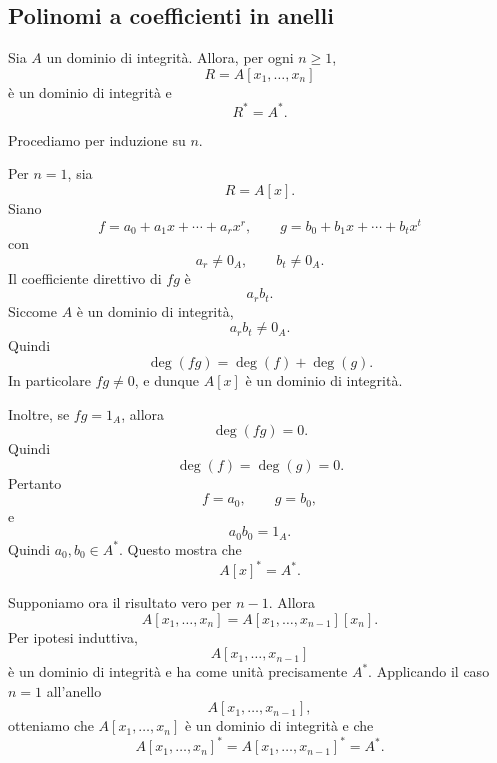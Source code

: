 \documentclass[a4paper]{article}
\begin{document}
\subsection{Polinomi a coefficienti in anelli}

\begin{radioactive}
\begin{snippetproposition}{}
    Sia \(A\) un dominio di integrità. Allora, per ogni \(n\geq 1\),
    \[
        R=A[x_1,\ldots,x_n]
    \]
    è un dominio di integrità e
    \[
        R^\ast=A^\ast.
    \]
\end{snippetproposition}
\end{radioactive}

\begin{radioactive}
\begin{snippetproof}{}
    Procediamo per induzione su \(n\).

    Per \(n=1\), sia
    \[
        R=A[x].
    \]
    Siano
    \[
        f=a_0+a_1x+\cdots+a_rx^r,
        \qquad
        g=b_0+b_1x+\cdots+b_tx^t
    \]
    con
    \[
        a_r\neq 0_A,
        \qquad
        b_t\neq 0_A.
    \]
    Il coefficiente direttivo di \(fg\) è
    \[
        a_rb_t.
    \]
    Siccome \(A\) è un dominio di integrità,
    \[
        a_rb_t\neq 0_A.
    \]
    Quindi
    \[
        \deg(fg)=\deg(f)+\deg(g).
    \]
    In particolare \(fg\neq 0\), e dunque \(A[x]\) è un dominio di integrità.

    Inoltre, se \(fg=1_A\), allora
    \[
        \deg(fg)=0.
    \]
    Quindi
    \[
        \deg(f)=\deg(g)=0.
    \]
    Pertanto
    \[
        f=a_0,
        \qquad
        g=b_0,
    \]
    e
    \[
        a_0b_0=1_A.
    \]
    Quindi \(a_0,b_0\in A^\ast\). Questo mostra che
    \[
        A[x]^\ast=A^\ast.
    \]

    Supponiamo ora il risultato vero per \(n-1\). Allora
    \[
        A[x_1,\ldots,x_n]
        =
        A[x_1,\ldots,x_{n-1}][x_n].
    \]
    Per ipotesi induttiva,
    \[
        A[x_1,\ldots,x_{n-1}]
    \]
    è un dominio di integrità e ha come unità precisamente \(A^\ast\).
    Applicando il caso \(n=1\) all'anello
    \[
        A[x_1,\ldots,x_{n-1}],
    \]
    otteniamo che \(A[x_1,\ldots,x_n]\) è un dominio di integrità e che
    \[
        A[x_1,\ldots,x_n]^\ast
        =
        A[x_1,\ldots,x_{n-1}]^\ast
        =
        A^\ast.
    \]
\end{snippetproof}
\end{radioactive}
\end{document}
